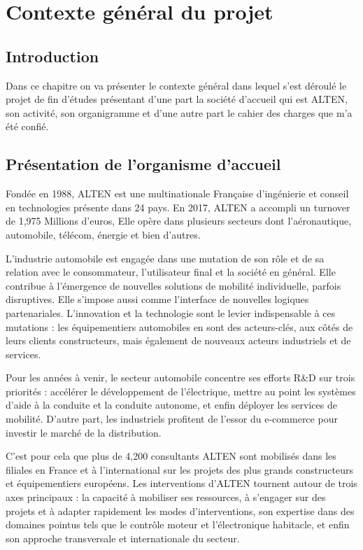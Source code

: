 \chapter{Contexte général du projet}
\section*{Introduction}
Dans ce chapitre on va présenter le contexte général dans lequel s’est déroulé le projet de fin d’études présentant d’une part la société d’accueil qui est ALTEN, son activité, son organigramme et d’une autre part le cahier des charges que m’a été confié.

\section{Présentation de l'organisme d'accueil}
Fondée en 1988, ALTEN est une multinationale Française d’ingénierie et conseil en technologies présente dans 24 pays. En 2017, ALTEN a accompli un turnover de 1,975 Millions d’euros, Elle opère dans plusieurs secteurs dont l’aéronautique, automobile, télécom, énergie et bien d’autres. 

L’industrie automobile est engagée dans une mutation de son rôle et de sa relation avec le consommateur, l’utilisateur final et la société en général. Elle contribue à l’émergence de nouvelles solutions de mobilité individuelle, parfois disruptives. Elle s’impose aussi comme l’interface de nouvelles logiques partenariales. L’innovation et la technologie sont le levier indispensable à ces mutations : les équipementiers automobiles en sont des acteurs-clés, aux côtés de leurs clients constructeurs, mais également de nouveaux acteurs industriels et de services.

Pour les années à venir, le secteur automobile concentre ses efforts R\&D sur trois priorités : accélérer le développement de l’électrique, mettre au point les systèmes d’aide à la conduite et la conduite autonome, et enfin déployer les services de mobilité. D’autre part, les industriels profitent de l’essor du e-commerce pour investir le marché de la distribution.

C’est pour cela que plus de 4,200 consultants ALTEN sont mobilisés dans les filiales en France et à l’international sur les projets des plus grands constructeurs et équipementiers européens. Les interventions d’ALTEN tournent autour de trois axes principaux : la capacité à mobiliser ses ressources, à s’engager sur des projets et à adapter rapidement les modes d’interventions, son expertise dans des domaines pointus tels que le contrôle moteur et l’électronique habitacle, et enfin son approche transversale et internationale du secteur.

